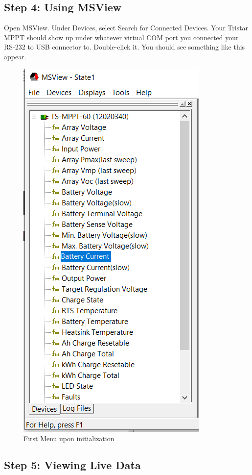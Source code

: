 \subsection{Step 4: Using MSView}
Open MSView.
Under Devices, select Search for Connected Devices. Your Tristar MPPT should show up under whatever virtual COM port you connected your RS-232 to USB connector to. Double-click it. You should see something like this appear.

\begin{figure}[h]
\includegraphics[width=0.7\columnwidth,angle=90,scale=0.75]{./graphics/tsmppt_troubleshooting/ms_2.png}
\caption{\label{fig:ms-website} First Menu upon initialization}
\end{figure}

\subsection{Step 5: Viewing Live Data}

